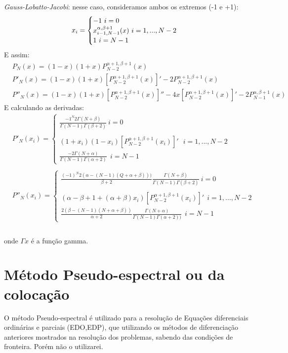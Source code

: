 \emph{Gauss-Lobatto-Jacobi}: nesse caso, consideramos ambos os extremos (-1 e +1):
\begin{equation}
 x_{i}= 
\begin{cases}
 -1 \ i = 0\\
 x^{\alpha,\beta +1}_{i-1,N-1}(x) \ i= 1,...,N-2\\
  1 \ i = N-1
\end{cases}\\
\end{equation}
 E assim:
 \begin{align}
  & P_{N}(x) =   (1-x)(1+x)P^{\alpha+1,\beta+1}_{N -2}(x)\\
  & P'_{N}(x) =  (1-x)(1+x)[P^{\alpha+1,\beta+1}_{N -2}(x)]' -  2P^{\alpha+1,\beta+1}_{N -2}(x)\\
  & P''_{N}(x) = (1-x)(1+x)[P^{\alpha+1,\beta+1}_{N -2}(x)]'' -4x[P^{\alpha+1,\beta+1}_{N -2}(x)]' - 2P^{\alpha,\beta+1}_{N -1}(x)
 \end{align}
 E calculando as derivadas:
 \begin{align}
  & P'_{N}(x_i)= 
\begin{cases}
 \frac{-1^{N}2\Gamma(N+ \beta)}{\Gamma(N-1)\Gamma(\beta+2)} \ i =0\\ \\
 (1+x_i)(1-x_i)[P^{\alpha+1,\beta+1}_{N-2}(x_i)]' \ \ \ i= 1,...,N-2\\ 
 \frac{-2\Gamma(N+\alpha)}{\Gamma(N-1)\Gamma(\alpha +2)} \ \ i = N-1
\end{cases}\\ \\
  & P''_{N}(x_i)= 
\begin{cases}
 \frac{(-1)^N 2(\alpha -(N-1)(Q+\alpha+\beta)))}{\beta + 2}\frac{\Gamma(N+\beta)}{\Gamma(N-1)\Gamma(\beta + 2)}\ i =0\\  \\
(\alpha -\beta +1+(\alpha+\beta)x_i)[P^{\alpha+1,\beta+1}_{N-2}(x_i)]'\ \ i= 1,...,N-2\\
\frac{2(\beta -(N-1)(N + \alpha + \beta))}{\alpha + 2}\frac{\Gamma(N+\alpha)}{\Gamma(N-1)\Gamma(\alpha+2))} \ \ i = N-1
\end{cases}\\
 \end{align}\\
 onde $\Gamma{x}$ é a função gamma.
 
\section{Método Pseudo-espectral ou da colocação}
 O método Pseudo-espectral é utilizado para a resolução de Equações diferenciais ordinárias e parciais (EDO,EDP), que utilizando os métodos de diferenciação anteriores mostrados na resolução dos problemas, sabendo das condições de fronteira. Porém não o utilizarei.
